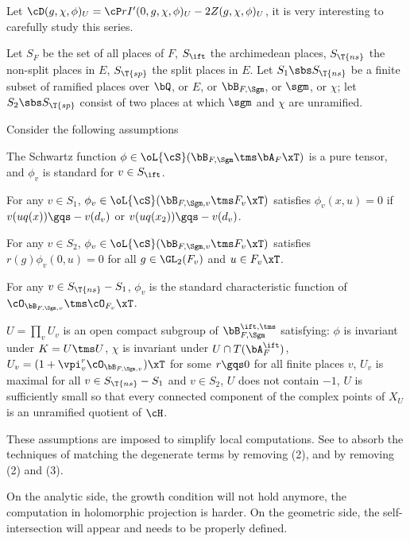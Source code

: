 \documentclass[article, a4paper, twoside]{universal}
\begin{document}

\begin{stp}
    Let $\cD(g,\chi,\phi)_{U}=\cP r I'(0,g,\chi,\phi)_{U}-2Z(g,\chi,\phi)_{U}$, it is very interesting to carefully study this series.
\end{stp}



\begin{stp}
    Let $S_{F}$ be the set of all places of $F$, $S_{\ift}$ the archimedean places, $S_{\T{ns}}$ the non-split places in $E$, $S_{\T{sp}}$ the split places in $E$. Let $S_{1}\sbs S_{\T{ns}}$ be a finite subset of ramified places over $\bQ$, or $E$, or $\bB_{F,\Sgm}$, or $\sgm$, or $\chi$; let $S_{2}\sbs S_{\T{sp}}$ consist of two places at which $\sgm$ and $\chi$ are unramified.


    Consider the following assumptions
    \begin{enr}[label=(\arabic*)]
        \item The Schwartz function $\phi\in\oL{\cS}(\bB_{F,\Sgm}\tms\bA_{F}\xT)$ is a pure tensor, and $\phi_{v}$ is standard for $v\in S_{\ift}$.
        \item For any $v\in S_{1}$, $\phi_{v}\in\oL{\cS}(\bB_{F,\Sgm,v}\tms F_{v}\xT)$ satisfies $\phi_{v}(x,u)=0$ if $v(uq(x))\gqs-v(d_{v})$ or $v(uq(x_{2}))\gqs-v(d_{v})$.
        \item For any $v\in S_{2}$, $\phi_{v}\in\oL{\cS}(\bB_{F,\Sgm,v}\tms F_{v}\xT)$ satisfies $r(g)\phi_{v}(0,u)=0$ for all $g\in\GL_{2}(F_{v})$ and $u\in F_{v}\xT$.
        \item For any $v\in S_{\T{ns}}-S_{1}$, $\phi_{v}$ is the standard characteristic function of $\cO_{\bB_{F,\Sgm,v}}\tms\cO_{F_{v}}\xT$.
        \item $U=\prod_{v}U_{v}$ is an open compact subgroup of $\bB_{F,\Sgm}^{\ift,\tms}$ satisfying: $\phi$ is invariant under $K=U\tms U$, $\chi$ is invariant under $U\cap T(\bA_{F}^{\ift})$, $U_{v}=(1+\vpi_{v}^{r}\cO_{\bB_{F,\Sgm,v}})\xT$ for some $r\gqs0$ for all finite places $v$, $U_{v}$ is maximal for all $v\in S_{\T{ns}}-S_{1}$ and $v\in S_{2}$, $U$ does not contain $-1$, $U$ is sufficiently small so that every connected component of the complex points of $X_{U}$ is an unramified quotient of $\cH$.
\end{enr}

\end{stp}

\begin{rmk}
    These assumptions are imposed to simplify local computations. See \cite{YZ2018,YZ2018Erratum} to absorb the techniques of matching the degenerate terms by removing (2), and \cite{Yuan2022} by removing (2) and (3).

    On the analytic side, the growth condition will not hold anymore, the computation in holomorphic projection is harder. On the geometric side, the self-intersection will appear and needs to be properly defined.
\end{rmk}
\end{document}
